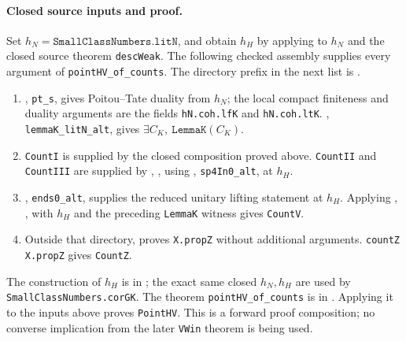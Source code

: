 \documentclass[11pt,a4paper]{article}
\theoremstyle{definition}
\begin{document}
\paragraph{Closed source inputs and proof.}
Set \(h_N=\texttt{SmallClassNumbers.litN}\), and obtain
\(h_H\) by applying
 to \(h_N\) and the
closed source theorem \texttt{descWeak}.  The following checked
assembly supplies every argument of \texttt{pointHV\_of\_counts}.
The directory prefix in the next list is
.
\begin{enumerate}
 \item {}, \texttt{pt\_s}, gives Poitou--Tate
 duality from \(h_N\); the local compact finiteness and duality
 arguments are the fields \texttt{hN.coh.lfK} and
 \texttt{hN.coh.ltK}.
 , \texttt{lemmaK\_litN\_alt}, gives
 \(\exists C_K,\ \texttt{LemmaK}(C_K)\).
 \item \texttt{CountI} is supplied by the closed composition proved
 above.  \texttt{CountII} and \texttt{CountIII} are supplied by
 ,
 , using
 , \texttt{sp4In0\_alt}, at \(h_H\).
 \item {}, \texttt{ends0\_alt}, supplies the
 reduced unitary lifting statement at \(h_H\).  Applying
 ,
 , with
 \(h_H\) and the preceding \texttt{LemmaK} witness gives
 \texttt{CountV}.
 \item Outside that directory, 
 proves \texttt{X.propZ} without additional arguments.
 \texttt{countZ X.propZ} gives \texttt{CountZ}.
\end{enumerate}
The construction of \(h_H\) is in
; the exact same closed
\(h_N,h_H\) are used by \texttt{SmallClassNumbers.corGK}.
The theorem \texttt{pointHV\_of\_counts} is in
.  Applying it to the
inputs above proves \texttt{PointHV}.  This is a forward proof
composition; no converse implication from the later \texttt{VWin}
theorem is being used.
\end{document}
